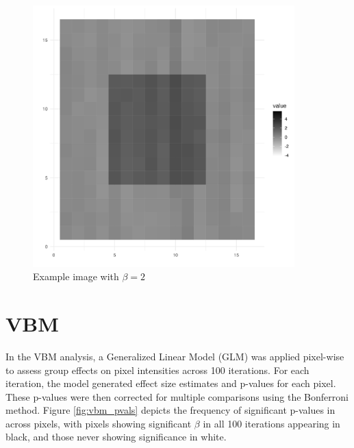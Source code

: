 \documentclass[12pt]{article}
\begin{document}
\begin{figure}[H]
    \begin{minipage}{0.45\textwidth}
        \centering
        \includegraphics[width=0.9\textwidth]{../Figures/image_ex2.png}
        \caption{Example image with \(\beta = 2\)}
        \label{fig:image3}
    \end{minipage}\hfill
    \begin{minipage}{0.45\textwidth}
    \end{minipage}
\end{figure}

\section*{VBM}

In the VBM analysis, a Generalized Linear Model (GLM) was applied pixel-wise to assess group effects on pixel intensities across 100 iterations. For each iteration, the model generated effect size estimates and p-values for each pixel. These p-values were then corrected for multiple comparisons using the Bonferroni method. Figure \ref{fig:vbm_pvals} depicts the frequency of significant p-values in across pixels, with pixels showing significant \(\beta\) in all 100 iterations appearing in black, and those never showing significance in white.
\end{document}
